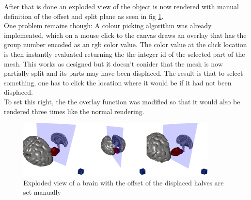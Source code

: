 After that is done an exploded view of the object is now rendered with manual definition of the offset and split plane as seen in fig \ref{fig:cerebellum}. \\
One problem remains though: A colour picking algorithm was already implemented, which on a mouse click to the canvas draws an overlay that has the group number encoded as an rgb color value. The color value at the click location is then instantly evaluated returning the the integer id of the selected part of the mesh. This works as designed but it doesn't conider that the mesh is now partially split and its parts may have been displaced. The result is that to select something, one has to click the location where it would be if it had not been displaced.\\
To set this right, the the overlay function was modified so that it would also be rendered three times like the normal rendering.
\begin{figure}[tb]
	\centering
	\includegraphics[width=0.9\textwidth]{chapters/figures/cerebellum}
	\caption{Exploded view of a brain with the offset of the displaced halves are set manually}
	\label{fig:cerebellum}
\end{figure}

